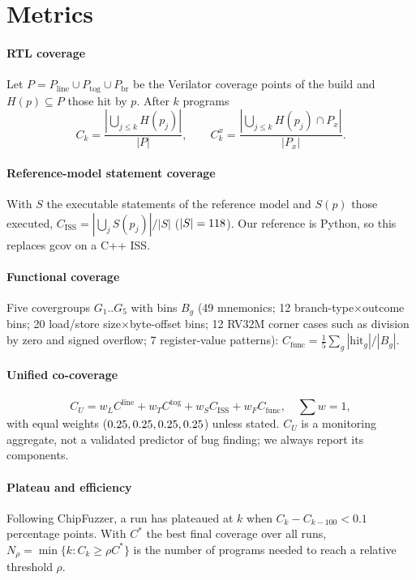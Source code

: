 \documentclass[conference,10pt]{IEEEtran}
\begin{document}
\section{Metrics}\label{sec:metrics}
\paragraph*{RTL coverage} Let $P = P_{\mathrm{line}} \cup P_{\mathrm{tog}} \cup P_{\mathrm{br}}$ be the Verilator coverage points of the
build and $H(p) \subseteq P$ those hit by $p$. After $k$ programs
\begin{equation}
  C_k = \frac{\left|\bigcup_{j \le k} H(p_j)\right|}{|P|},\qquad C_k^{x} = \frac{\left|\bigcup_{j \le k} H(p_j) \cap P_x\right|}{|P_x|}.
\end{equation}
\paragraph*{Reference-model statement coverage} With $S$ the executable statements of the reference model and $S(p)$ those executed,
$C_{\mathrm{ISS}} = |\bigcup_j S(p_j)|/|S|$ ($|S| = 118$). Our reference is Python, so this replaces gcov on a C++ ISS.
\paragraph*{Functional coverage} Five covergroups $G_1..G_5$ with bins $B_g$ (49 mnemonics; 12 branch-type$\times$outcome bins; 20
load/store size$\times$byte-offset bins; 12 RV32M corner cases such as division by zero and signed overflow; 7 register-value
patterns): $C_{\mathrm{func}} = \frac{1}{5}\sum_g |\mathrm{hit}_g|/|B_g|$.
\paragraph*{Unified co-coverage}
\begin{equation}
  C_U = w_L C^{\mathrm{line}} + w_T C^{\mathrm{tog}} + w_S C_{\mathrm{ISS}} + w_F C_{\mathrm{func}},\quad \textstyle\sum w = 1,
\end{equation}
with equal weights ($0.25, 0.25, 0.25, 0.25$) unless stated. $C_U$ is a monitoring aggregate, not a validated predictor of bug finding; we always
report its components.
\paragraph*{Plateau and efficiency} Following ChipFuzzer, a run has plateaued at $k$ when $C_k - C_{k-100} < 0.1$ percentage points.
With $C^\ast$ the best final coverage over all runs, $N_\rho = \min\{k : C_k \ge \rho C^\ast\}$ is the number of programs needed to reach
a relative threshold $\rho$.
\end{document}
